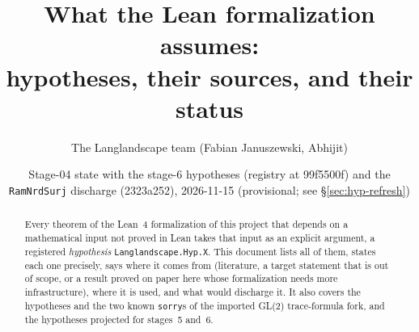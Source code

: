 \documentclass[11pt]{amsart}
\title{What the Lean formalization assumes:\\ hypotheses, their sources, and their status}
\author{The Langlandscape team (Fabian Januszewski, Abhijit)}
\date{Stage-04 state with the stage-6 hypotheses (registry at 99f5500f) and the \texttt{RamNrdSurj} discharge (2323a252), 2026-11-15 (provisional; see \S\ref{sec:hyp-refresh})}
\begin{document}
\begin{abstract}
  Every theorem of the Lean~4 formalization of this project that depends on a mathematical input not proved in Lean
  takes that input as an explicit argument, a registered \emph{hypothesis} \texttt{Langlandscape.Hyp.X}. This
  document lists all of them, states each one precisely, says where it comes from (literature, a target statement
  that is out of scope, or a result proved on paper here whose formalization needs more infrastructure), where it is
  used, and what would discharge it. It also covers the hypotheses and the two known \texttt{sorry}s of the
  imported GL(2) trace-formula fork, and the hypotheses projected for stages~5 and~6.
\end{abstract}
\maketitle
\setcounter{tocdepth}{1}
\tableofcontents

{\sloppy\printbibliography}
\end{document}
